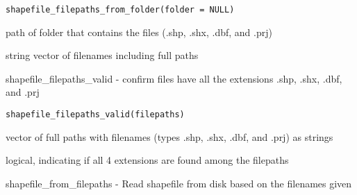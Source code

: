 \documentclass[a4paper]{book}
\begin{document}
%
\begin{Usage}
\begin{verbatim}
shapefile_filepaths_from_folder(folder = NULL)
\end{verbatim}
\end{Usage}
%
\begin{Arguments}
\begin{ldescription}
\item[\code{folder}] path of folder that contains the files (.shp, .shx, .dbf, and .prj)
\end{ldescription}
\end{Arguments}
%
\begin{Value}
string vector of filenames including full paths
\end{Value}
%
\begin{SeeAlso}\relax
{}
\end{SeeAlso}
%
\begin{Description}\relax
shapefile\_filepaths\_valid  -  confirm files have all the extensions .shp, .shx, .dbf, and .prj
\end{Description}
%
\begin{Usage}
\begin{verbatim}
shapefile_filepaths_valid(filepaths)
\end{verbatim}
\end{Usage}
%
\begin{Arguments}
\begin{ldescription}
\item[\code{filepaths}] vector of full paths with filenames (types .shp, .shx, .dbf, and .prj) as strings
\end{ldescription}
\end{Arguments}
%
\begin{Value}
logical, indicating if all 4 extensions are found among the filepaths
\end{Value}
%
\begin{SeeAlso}\relax
{}
\end{SeeAlso}
%
\begin{Description}\relax
shapefile\_from\_filepaths  -  Read shapefile from disk based on the filenames given
\end{Description}
\end{document}
